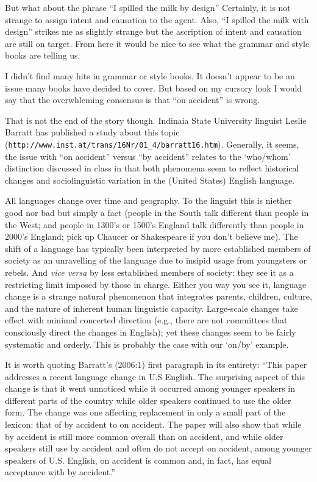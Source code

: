 \documentclass{wpblogentry}
\begin{document}
But what about the phrase ``I spilled the milk by design'' Certainly, it is not strange to assign intent and causation to the agent. Also, ``I spilled the milk with design'' strikes me as slightly strange but the ascription of intent and causation are still on target. From here it would be nice to see what the grammar and style books are telling us.

I didn't find many hits in grammar or style books. It doesn't appear to be an issue many books have decided to cover. But based on my cursory look I would say that the overwhleming consensus is that ``on accident'' is wrong. 

That is not the end of the story though. Indinaia State University linguist Leslie Barratt  has published a study about this topic (\verb=http://www.inst.at/trans/16Nr/01_4/barratt16.htm=). Generally, it seems, the issue with ``on accident'' versus ``by accident'' relates to the `who/whom' distinction discussed in class in that both phenomena seem to reflect historical changes and sociolinguistic variation in the (United States) English language.

All languages change over time and geography. To the linguist this is niether good nor bad but simply a fact (people in the South talk different than people in the West; and people in 1300's or  1500's England talk differently than people in 2000's England; pick up Chaucer or Shakespeare if you don't believe me). The shift of a language has typically been interpreted by more established members of society as an unravelling of the language due to insipid usage from youngsters or rebels. And \emph{vice versa} by less established members of society: they see it as a restricting limit imposed by those in charge. Either you way you see it, language change is a strange natural phenomenon that integrates parents, children, culture, and the nature of inherent human linguistic capacity. Large-scale changes take effect with minimal concerted direction (e.g., there are not committees that consciously direct the changes in English); yet these changes seem to be fairly systematic and orderly. This is probably the case with our `on/by' example.

It is worth quoting Barratt's (2006:1) first paragraph in its entirety: ``This paper addresses a recent language change in U.S English. The surprising aspect of this change is that it went unnoticed while it occurred among younger speakers in different parts of the country while older speakers continued to use the older form. The change was one affecting replacement in only a small part of the lexicon: that of by accident to on accident. The paper will also show that while by accident is still more common overall than on accident, and while older speakers still use by accident and often do not accept on accident, among younger speakers of U.S. English, on accident is common and, in fact, has equal acceptance with by accident.''
\end{document}

